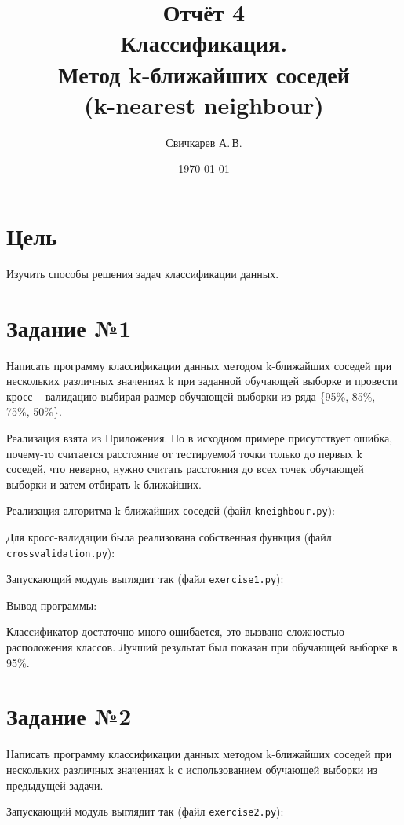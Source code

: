 \documentclass{article} %
\title{Отчёт 4\protect\\Классификация.\\Метод k-ближайших соседей\\(k-nearest
neighbour)} %
\author{Свичкарев А.\,В.} %
\date{\today} %
\begin{document}

\maketitle %

\section{Цель}
Изучить способы решения задач классификации данных.

\section{Задание №1}
Написать программу классификации данных методом k-ближайших соседей при
нескольких различных значениях k при заданной обучающей выборке и провести кросс –
валидацию выбирая размер обучающей выборки из ряда \{95\%, 85\%, 75\%, 50\%\}.
\bigskip

Реализация взята из Приложения.
Но в исходном примере присутствует ошибка,
почему-то считается расстояние от тестируемой точки
только до первых k соседей, что неверно,
нужно считать расстояния до всех точек обучающей выборки
и затем отбирать k ближайших.

\clearpage
Реализация алгоритма k-ближайших соседей (файл \verb$kneighbour.py$):

\clearpage
Для кросс-валидации была реализована собственная функция (файл \verb$crossvalidation.py$):

\clearpage
Запускающий модуль выглядит так (файл \verb$exercise1.py$):
\bigskip


Вывод программы:


Классификатор достаточно много ошибается,
это вызвано сложностью расположения классов.
Лучший результат был показан при обучающей выборке в 95\%.

\clearpage
\section{Задание №2}
Написать программу классификации данных методом k-ближайших соседей при
нескольких различных значениях k с использованием обучающей выборки из предыдущей
задачи.
\bigskip

Запускающий модуль выглядит так (файл \verb$exercise2.py$):
\bigskip
\end{document}

